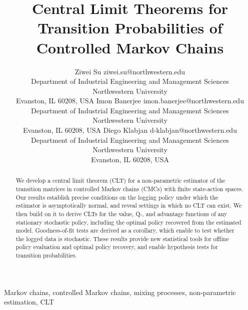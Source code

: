 \documentclass[twoside,11pt]{article}
\numberwithin{equation}{section}
\begin{document}
\title{Central Limit Theorems for Transition Probabilities of Controlled Markov
Chains}

\author{\name Ziwei Su \email ziwei.su@northwestern.edu \\
       \addr Department of Industrial Engineering and Management Sciences\\
       Northwestern University\\
       Evanston, IL 60208, USA
       \AND
       \name Imon Banerjee \email imon.banerjee@northwestern.edu \\
        \addr Department of Industrial Engineering and Management Sciences\\
       Northwestern University\\
       Evanston, IL 60208, USA
       \AND 
        \name Diego Klabjan \email d-klabjan@northwestern.edu \\
        \addr Department of Industrial Engineering and Management Sciences\\
       Northwestern University\\
       Evanston, IL 60208, USA}

\editor{}

\maketitle

\begin{abstract}
We develop a central limit theorem (CLT) for a non-parametric estimator of the transition matrices in controlled Markov chains (CMCs) with finite state-action spaces. 
Our results establish precise conditions on the logging policy under which the estimator is asymptotically normal, and reveal settings in which no CLT can exist. 
We then build on it to derive CLTs for the value, Q-, and advantage functions of any stationary stochastic policy, including the optimal policy recovered from the estimated model.  
Goodness-of-fit tests are derived as a corollary, which enable to test whether the logged data is stochastic.
These results provide new statistical tools for offline policy evaluation and optimal policy recovery, and enable hypothesis tests for transition probabilities.
\end{abstract}

\begin{keywords}
  Markov chains, controlled Markov chains, mixing processes, non-parametric estimation, CLT
\end{keywords}
\end{document}
